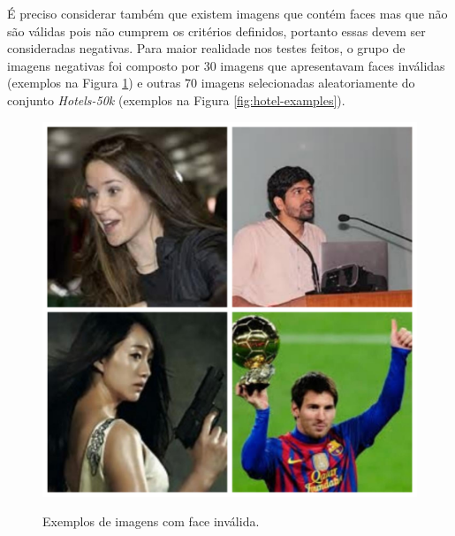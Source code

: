 É preciso considerar também que existem imagens que contém faces mas que não são válidas pois não cumprem os critérios definidos, portanto essas devem ser consideradas negativas. Para maior realidade nos testes feitos, o grupo de imagens negativas foi composto por 30 imagens que apresentavam faces inválidas (exemplos na Figura \ref{fig:invalid-faces}) e outras 70 imagens selecionadas aleatoriamente do conjunto \textit{Hotels-50k} (exemplos na Figura \ref{fig:hotel-examples}).

\begin{figure}[htb]
    \centering
    \caption{Exemplos de imagens com face inválida.}
    \includegraphics[scale=.25]{figs/invalid_faces.jpg}
    \label{fig:invalid-faces}
\end{figure}

